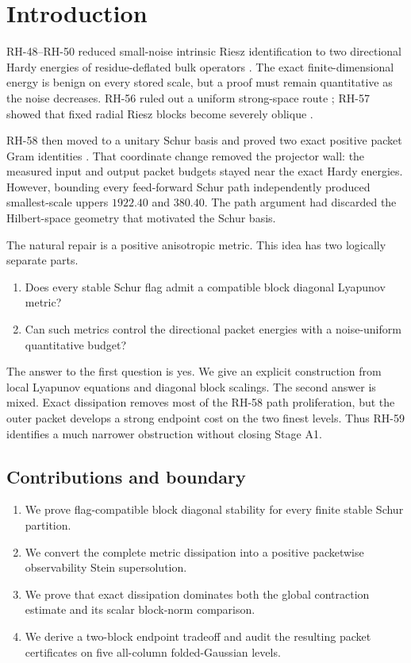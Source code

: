 \documentclass[11pt]{article}
\theoremstyle{remark}
\begin{document}
\section{Introduction}

RH-48--RH-50 reduced small-noise intrinsic Riesz identification to two
directional Hardy energies of residue-deflated bulk operators
\citep{WangIntrinsic2026,WangDirectional2026,WangHardy2026}.  The exact
finite-dimensional energy is benign on every stored scale, but a proof must
remain quantitative as the noise decreases.  RH-56 ruled out a uniform
strong-space route \citep{WangHardyBarrier2026}; RH-57 showed that fixed
radial Riesz blocks become severely oblique
\citep{WangRieszOverlap2026}.

RH-58 then moved to a unitary Schur basis and proved two exact positive packet
Gram identities \citep{WangSchurGram2026}.  That coordinate change removed
the projector wall: the measured input and output packet budgets stayed near
the exact Hardy energies.  However, bounding every feed-forward Schur path
independently produced smallest-scale uppers $1922.40$ and $380.40$.  The
path argument had discarded the Hilbert-space geometry that motivated the
Schur basis.

The natural repair is a positive anisotropic metric.  This idea has two
logically separate parts.
\begin{enumerate}[leftmargin=2.2em]
 \item Does every stable Schur flag admit a compatible block diagonal
       Lyapunov metric?
 \item Can such metrics control the directional packet energies with a
       noise-uniform quantitative budget?
\end{enumerate}
The answer to the first question is yes.  We give an explicit construction
from local Lyapunov equations and diagonal block scalings.  The second answer
is mixed.  Exact dissipation removes most of the RH-58 path proliferation,
but the outer packet develops a strong endpoint cost on the two finest
levels.  Thus RH-59 identifies a much narrower obstruction without closing
Stage A1.

\subsection*{Contributions and boundary}

\begin{enumerate}[leftmargin=2.2em]
 \item We prove flag-compatible block diagonal stability for every finite
       stable Schur partition.
 \item We convert the complete metric dissipation into a positive
       packetwise observability Stein supersolution.
 \item We prove that exact dissipation dominates both the global contraction
       estimate and its scalar block-norm comparison.
 \item We derive a two-block endpoint tradeoff and audit the resulting
       packet certificates on five all-column folded-Gaussian levels.
\end{enumerate}
\end{document}
